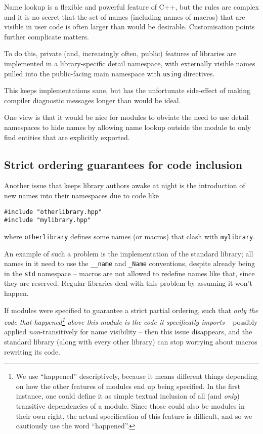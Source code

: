 \documentclass[reqno]{article}
\begin{document}
Name lookup is a flexible and powerful feature of C++, but the rules are
complex and it is no secret that the set of names (including names of macros)
that are visible in user code is often larger than would be desirable.
Customisation points further complicate matters.

To do this, private (and, increasingly often, public) features of libraries are
implemented in a library-specific detail namespace, with externally visible
names pulled into the public-facing main namespace with \texttt{using}
directives.

This keeps implementations sane, but has the unfortunate side-effect of making
compiler diagnostic messages longer than would be ideal.

One view is that it would be nice for modules to obviate the need to use detail
namespaces to hide names by allowing name lookup outside the module to only
find entities that are explicitly exported.


\subsection{Strict ordering guarantees for code inclusion}

Another issue that keeps library authors awake at night is the introduction of
new names into their namespaces due to code like

\begin{verbatim}
#include "otherlibrary.hpp"
#include "mylibrary.hpp"
\end{verbatim}

where \texttt{otherlibrary} defines some names (or macros) that clash with
\texttt{mylibrary}.

An example of such a problem is the implementation of the standard library; all
names in it need to use the \texttt{\_\_name} and \texttt{\_Name} conventions,
despite already being in the \texttt{std} namespace -- macros are not allowed
to redefine names like that, since they are reserved. Regular libraries deal
with this problem by assuming it won't happen.

If modules were specified to guarantee a strict partial ordering, such that
\emph{only the code that happened\footnote{We use ``happened'' descriptively,
because it means different things depending on how the other features of
modules end up being specified. In the first instance, one could define it as
simple textual inclusion of all (and \emph{only}) transitive dependencies of a
module. Since those could also be modules in their own right, the actual
specification of this feature is difficult, and so we cautiously use the word
``happened''.} above this module is the code it specifically imports} --
possibly applied \emph{non}-transitively for name visibility -- then this issue
disappears, and the standard library (along with every other library) can stop
worrying about macros rewriting its code.
\end{document}
